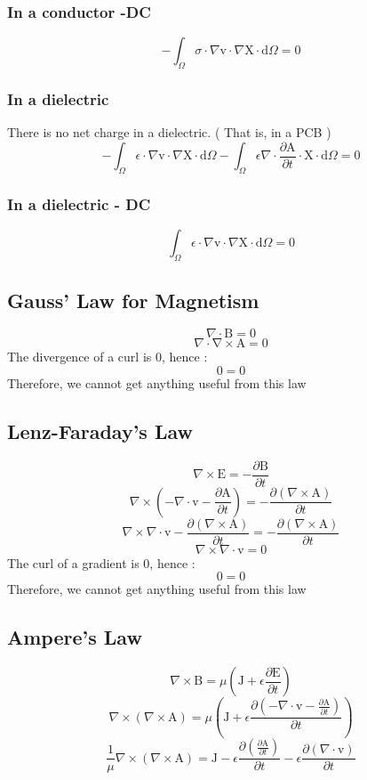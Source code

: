 \documentclass[10pt]{article}         %
\begin{document}
\subsubsection{ In a conductor -DC }

\[ -\int_{\Omega} \sigma \cdot \nabla  \mathrm{v}  \cdot \nabla \mathrm{X} \cdot \mathrm{d}\Omega = 0  \]
\subsubsection{ In a dielectric  }
There is no net charge in a dielectric. ( That is, in a PCB )
\[ -\int_{\Omega} \epsilon \cdot \nabla  \mathrm{v}  \cdot \nabla \mathrm{X} \cdot \mathrm{d}\Omega  - \int_{\Omega} \epsilon  \nabla \cdot \frac{\partial  \mathrm{A}  }{ \partial t } \cdot \mathrm{X} \cdot  \mathrm{d}\Omega = 0 \]
\subsubsection{ In a dielectric - DC  }
\[ \int_{\Omega} \epsilon \cdot \nabla  \mathrm{v}  \cdot \nabla \mathrm{X} \cdot \mathrm{d}\Omega = 0  \]

\subsection{Gauss' Law for Magnetism}
\[ \nabla \cdot \mathrm{B} = 0 \]
\[ \nabla \cdot \mathrm{\nabla \times \mathrm{A}} = 0 \]
The divergence of a curl is 0, hence :
\[ 0 = 0 \]
Therefore, we cannot get anything useful from this law
\subsection{Lenz-Faraday's Law}
\[ \nabla \times \mathrm{E} = - \frac{ \partial \mathrm{B} }{ \partial t } \]
\[ \nabla \times \left( - \nabla \cdot \mathrm{v}  - \frac{\partial  \mathrm{A}  }{ \partial t } \right) = - \frac{ \partial \left( \nabla \times \mathrm{A} \right) }{ \partial t } \]
\[ \nabla \times  \nabla \cdot \mathrm{v}  - \frac{ \partial \left( \nabla \times \mathrm{A} \right) }{ \partial t } = - \frac{ \partial \left( \nabla \times \mathrm{A} \right) }{ \partial t } \]
\[ \nabla \times  \nabla \cdot \mathrm{v}  = 0 \]
The curl of a gradient is 0, hence :
\[ 0 = 0 \]
Therefore, we cannot get anything useful from this law


\subsection{Ampere's Law}
\[ \nabla \times \mathrm{B} = \mu \left(  \mathrm{ J }  + \epsilon \frac{ \partial \mathrm{E} }{ \partial t } \right) \]
\[ \nabla \times ( \nabla \times \mathrm{A} ) = \mu \left(  \mathrm{ J }  + \epsilon \frac{ \partial \left( - \nabla \cdot \mathrm{v}  - \frac{\partial  \mathrm{A}  }{ \partial t } \right) }{ \partial t } \right) \]
\[ \frac{1}{\mu} \nabla \times (\nabla \times \mathrm{A} ) =   \mathrm{ J }  - \epsilon \frac{ \partial \left(  \frac{\partial  \mathrm{A}  }{ \partial t } \right) }{ \partial t } - \epsilon \frac{ \partial \left(  \nabla \cdot \mathrm{v}  \right) }{ \partial t } \]
\end{document}
